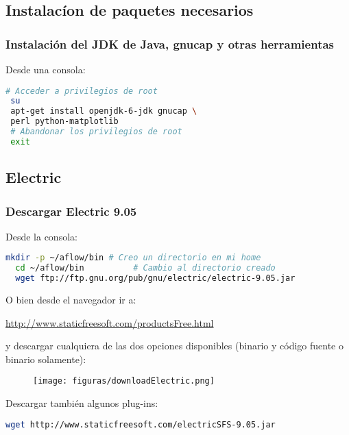 \documentclass{beamer}
\begin{document}
\begin{frame}[fragile]
\subsection{Instalacíon de paquetes necesarios } %

\frametitle{Instalación del JDK de Java, gnucap y otras herramientas}

\noindent Desde una consola:
\begin{lstlisting}[language=bash]
 # Acceder a privilegios de root
 su
 apt-get install openjdk-6-jdk gnucap \
 perl python-matplotlib
 # Abandonar los privilegios de root
 exit
\end{lstlisting}
\end{frame}

\subsection{Electric}
\begin{frame}[fragile]
\frametitle{Descargar Electric 9.05}

\noindent Desde la consola:
\begin{scriptsize}
\begin{lstlisting}[language=bash]
  mkdir -p ~/aflow/bin # Creo un directorio en mi home
  cd ~/aflow/bin	      # Cambio al directorio creado
  wget ftp://ftp.gnu.org/pub/gnu/electric/electric-9.05.jar
\end{lstlisting}
\end{scriptsize}

O bien desde el navegador ir a:

 \url{http://www.staticfreesoft.com/productsFree.html}

y descargar cualquiera de las dos opciones disponibles (binario y código fuente o binario solamente):
\begin{figure}
\texttt{[image: figuras/downloadElectric.png]}
\end{figure}
Descargar también algunos plug-ins:
\begin{scriptsize}
\begin{lstlisting}[language=bash]
  wget http://www.staticfreesoft.com/electricSFS-9.05.jar
\end{lstlisting}
\end{scriptsize}
\end{frame}
\end{document}
